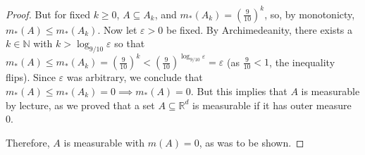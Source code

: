 \begin{proof}
But for fixed \( k \geq 0 \), \( A \subseteq A_k \), and \( m_*(A_k) = (\frac{9}{10})^{k}  \), so, by monotonicty, \( m_*(A) \leq m_*(A_k)\). Now let \( \varepsilon > 0 \) be fixed. By Archimedeanity, there exists a \( k \in \mathbb{N}  \) with \( k > \log_{9/10} \varepsilon   \) so that \(m_*(A) \leq m_*(A_k) =  (\frac{9}{10} )^{k} < ( \frac{9}{10})^{\log_{9/10} \varepsilon} = \varepsilon     \) (as \( \frac{9}{10} < 1 \), the inequality flips). Since \( \varepsilon  \) was arbitrary, we conclude that \( m_*(A) \leq m_*(A_k) = 0 \implies m_*(A) = 0. \) But this implies that \( A \) is measurable by lecture, as we proved that a set \( A \subseteq \mathbb{R}^{d}  \) is measurable if it has outer measure 0.

Therefore, \( A \) is measurable with \( m(A) = 0 \), as was to be shown.



\end{proof}
